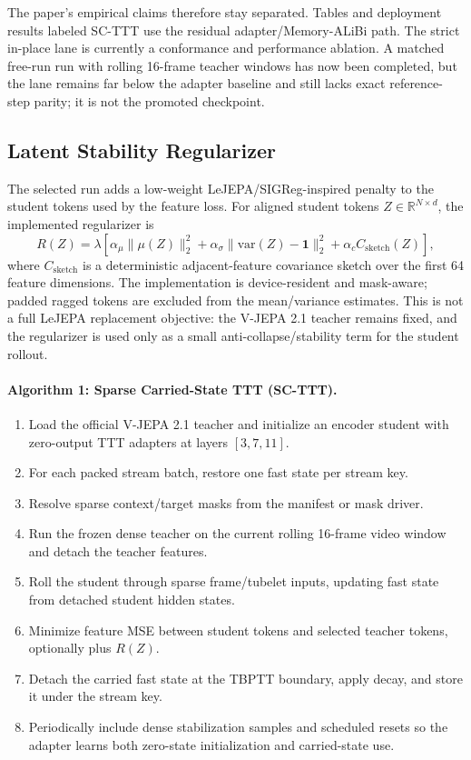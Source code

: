 \documentclass[10pt]{article}
\begin{document}
The paper's empirical claims therefore stay separated.  Tables and deployment
results labeled SC-TTT use the residual adapter/Memory-ALiBi path.  The strict
in-place lane is currently a conformance and performance ablation.  A matched
free-run run with rolling 16-frame teacher windows has now been completed, but
the lane remains far below the adapter baseline and still lacks exact
reference-step parity; it is not the promoted checkpoint.

\subsection{Latent Stability Regularizer}

The selected run adds a low-weight LeJEPA/SIGReg-inspired penalty to the
student tokens used by the feature loss.  For aligned student tokens
$Z\in\mathbb{R}^{N\times d}$, the implemented regularizer is
\begin{equation}
R(Z) =
\lambda\left[
\alpha_\mu \|\mu(Z)\|_2^2 +
\alpha_\sigma \|\mathrm{var}(Z)-\mathbf{1}\|_2^2 +
\alpha_c C_{\mathrm{sketch}}(Z)
\right],
\end{equation}
where $C_{\mathrm{sketch}}$ is a deterministic adjacent-feature covariance
sketch over the first 64 feature dimensions.  The implementation is
device-resident and mask-aware; padded ragged tokens are excluded from the
mean/variance estimates.  This is not a full LeJEPA replacement objective: the
V-JEPA 2.1 teacher remains fixed, and the regularizer is used only as a small
anti-collapse/stability term for the student rollout.

\paragraph{Algorithm 1: Sparse Carried-State TTT (SC-TTT).}
\begin{enumerate}
\item Load the official V-JEPA 2.1 teacher and initialize an encoder student
  with zero-output TTT adapters at layers $[3,7,11]$.
\item For each packed stream batch, restore one fast state per stream key.
\item Resolve sparse context/target masks from the manifest or mask driver.
\item Run the frozen dense teacher on the current rolling 16-frame video window
  and detach the teacher features.
\item Roll the student through sparse frame/tubelet inputs, updating fast
  state from detached student hidden states.
\item Minimize feature MSE between student tokens and selected teacher tokens,
  optionally plus $R(Z)$.
\item Detach the carried fast state at the TBPTT boundary, apply decay, and
  store it under the stream key.
\item Periodically include dense stabilization samples and scheduled resets so
  the adapter learns both zero-state initialization and carried-state use.
\end{enumerate}
\end{document}
